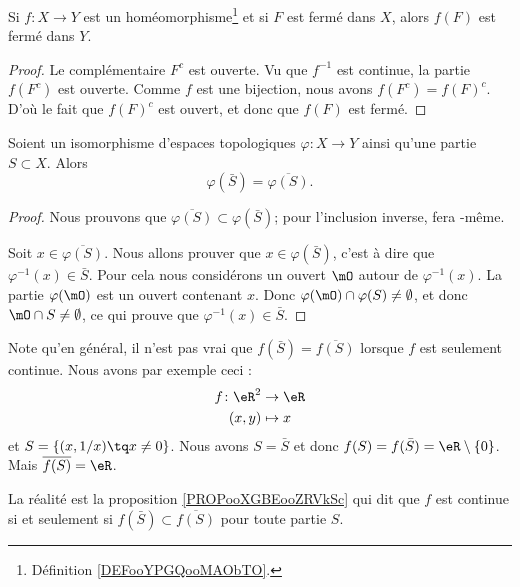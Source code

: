 \begin{lemma}        \label{LEMooMJSHooOszteq}
	Si \( f\colon X\to Y\) est un homéomorphisme\footnote{Définition \ref{DEFooYPGQooMAObTO}.} et si \( F\) est fermé dans \( X\), alors \( f(F)\) est fermé dans \( Y\).
\end{lemma}

\begin{proof}
	Le complémentaire \( F^c\) est ouverte. Vu que \( f^{-1}\) est continue, la partie \( f(F^c)\) est ouverte. Comme \( f\) est une bijection, nous avons \( f(F^c)=f(F)^c\). D'où le fait que \( f(F)^c\) est ouvert, et donc que \( f(F)\) est fermé.
\end{proof}


\begin{lemma}		\label{LEMooNMPGooRlgppQ}
	Soient un isomorphisme d'espaces topologiques \(\varphi \colon X\to Y  \) ainsi qu'une partie \( S\subset X\). Alors
	\begin{equation}
		\varphi(\bar S)=\overline{\varphi(S)}.
	\end{equation}
\end{lemma}

\begin{proof}
	Nous prouvons que \( \overline{\varphi(S)}\subset\varphi(\bar S)\); pour l'inclusion inverse,  fera -même.

	Soit \( x\in\overline{\varphi(S)}\). Nous allons prouver que \( x\in\varphi(\bar S)\), c'est à dire que \( \varphi^{-1}(x)\in \bar S\). Pour cela nous considérons un ouvert \( \mO\) autour de \( \varphi^{-1}(x)\). La partie \( \varphi(\mO)\) est un ouvert contenant \( x\). Donc \( \varphi(\mO)\cap\varphi(S)\neq \emptyset\), et donc \( \mO\cap S\neq\emptyset\), ce qui prouve que \( \varphi^{-1}(x)\in\bar S\).
\end{proof}

\begin{normaltext}
	Note qu'en général, il n'est pas vrai que \( f(\bar S)=\overline{f(S)}\) lorsque \( f\) est seulement continue. Nous avons par exemple\cite{BIBooVVEUooPCYkeX} ceci :
	\begin{equation}
		\begin{aligned}
			f\colon \eR^2 & \to \eR   \\
			(x,y)         & \mapsto x
		\end{aligned}
	\end{equation}
	et \( S=\{ (x,1/x)\tq x\neq 0 \}\). Nous avons \( S=\bar S\) et donc \( f(S)=f(\bar S)=\eR\setminus\{ 0 \}\). Mais \( \overline{f(S)}=\eR\).

	La réalité est la proposition \ref{PROPooXGBEooZRVkSc} qui dit que \( f\) est continue si et seulement si \( f(\bar S)\subset \overline{f(S)}\) pour toute partie \( S\).
\end{normaltext}

